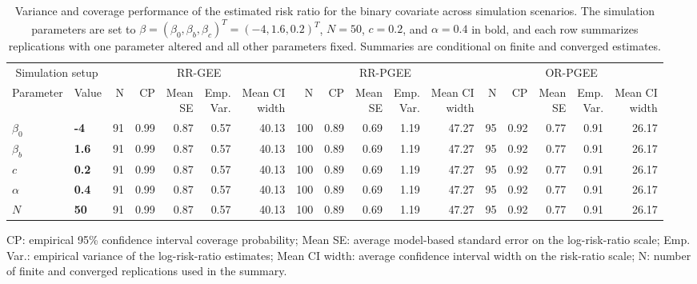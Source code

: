 \begin{table}[htbp]
\centering
\tiny
\setlength{\tabcolsep}{2pt}
\renewcommand{\arraystretch}{1.15}
\caption{Variance and coverage performance of the estimated risk ratio for the binary covariate across simulation scenarios. The simulation parameters are set to $\beta = (\beta_0, \beta_b, \beta_c)^T = (-4, 1.6, 0.2)^T$, $N = 50$, $c = 0.2$, and $\alpha = 0.4$ in bold, and each row summarizes replications with one parameter altered and all other parameters fixed. Summaries are conditional on finite and converged estimates.}
\begin{tabular}{ll|rrrrr|rrrrr|rrrrr}
\hline
\multicolumn{2}{c|}{Simulation setup} & \multicolumn{5}{c|}{RR-GEE} & \multicolumn{5}{c|}{RR-PGEE} & \multicolumn{5}{c}{OR-PGEE} \\
Parameter & Value & N & CP & \shortstack{Mean\\SE} & \shortstack{Emp.\\Var.} & \shortstack{Mean CI\\width} & N & CP & \shortstack{Mean\\SE} & \shortstack{Emp.\\Var.} & \shortstack{Mean CI\\width} & N & CP & \shortstack{Mean\\SE} & \shortstack{Emp.\\Var.} & \shortstack{Mean CI\\width} \\
\hline
$\beta_0$ & \textbf{-4} & 91 & 0.99 & 0.87 & 0.57 & 40.13 & 100 & 0.89 & 0.69 & 1.19 & 47.27 & 95 & 0.92 & 0.77 & 0.91 & 26.17 \\
\hline
$\beta_b$ & \textbf{1.6} & 91 & 0.99 & 0.87 & 0.57 & 40.13 & 100 & 0.89 & 0.69 & 1.19 & 47.27 & 95 & 0.92 & 0.77 & 0.91 & 26.17 \\
\hline
$c$ & \textbf{0.2} & 91 & 0.99 & 0.87 & 0.57 & 40.13 & 100 & 0.89 & 0.69 & 1.19 & 47.27 & 95 & 0.92 & 0.77 & 0.91 & 26.17 \\
\hline
$\alpha$ & \textbf{0.4} & 91 & 0.99 & 0.87 & 0.57 & 40.13 & 100 & 0.89 & 0.69 & 1.19 & 47.27 & 95 & 0.92 & 0.77 & 0.91 & 26.17 \\
\hline
$N$ & \textbf{50} & 91 & 0.99 & 0.87 & 0.57 & 40.13 & 100 & 0.89 & 0.69 & 1.19 & 47.27 & 95 & 0.92 & 0.77 & 0.91 & 26.17 \\
\hline
\end{tabular}
\begin{flushleft}
\footnotesize CP: empirical 95\% confidence interval coverage probability; Mean SE: average model-based standard error on the log-risk-ratio scale; Emp. Var.: empirical variance of the log-risk-ratio estimates; Mean CI width: average confidence interval width on the risk-ratio scale; N: number of finite and converged replications used in the summary.
\end{flushleft}
\end{table}
